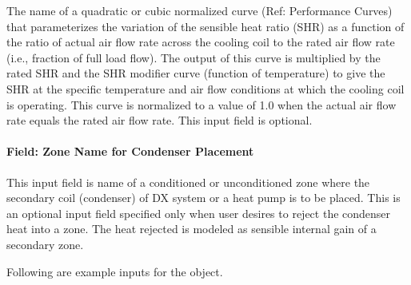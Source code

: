 The name of a quadratic or cubic normalized curve (Ref: Performance Curves) that parameterizes the variation of the sensible heat ratio (SHR) as a function of the ratio of actual air flow rate across the cooling coil to the rated air flow rate (i.e., fraction of full load flow). The output of this curve is multiplied by the rated SHR and the SHR modifier curve (function of temperature) to give the SHR at the specific temperature and air flow conditions at which the cooling coil is operating. This curve is normalized to a value of 1.0 when the actual air flow rate equals the rated air flow rate. This input field is optional.

\paragraph{Field: Zone Name for Condenser Placement}\label{field-zone-name-for-condenser-placement-1}

This input field is name of a conditioned or unconditioned zone where the secondary coil (condenser) of DX system or a heat pump is to be placed. This is an optional input field specified only when user desires to reject the condenser heat into a zone. The heat rejected is modeled as sensible internal gain of a secondary zone.

Following are example inputs for the object.

